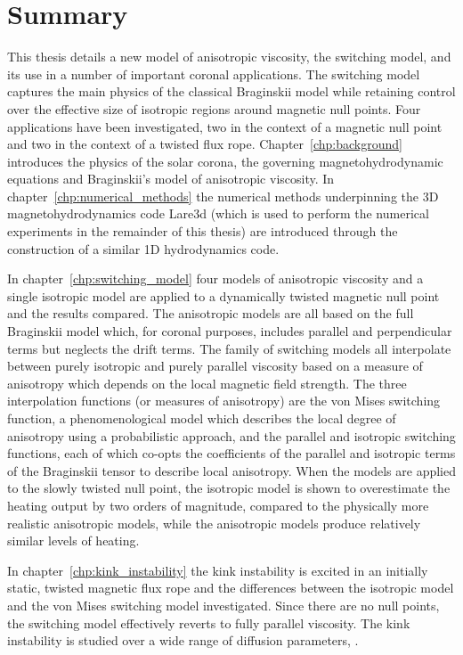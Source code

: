 \chapter{Summary}

This thesis details a new model of anisotropic viscosity, the switching model, and its use in a number of important coronal applications. The switching model captures the main physics of the classical Braginskii model while retaining control over the effective size of isotropic regions around magnetic null points. Four applications have been investigated, two in the context of a magnetic null point and two in the context of a twisted flux rope. Chapter~\ref{chp:background} introduces the physics of the solar corona, the governing magnetohydrodynamic equations and Braginskii's model of anisotropic viscosity. In chapter~\ref{chp:numerical_methods} the numerical methods underpinning the 3D magnetohydrodynamics code Lare3d (which is used to perform the numerical experiments in the remainder of this thesis) are introduced through the construction of a similar 1D hydrodynamics code.

In chapter~\ref{chp:switching_model} four models of anisotropic viscosity and a single isotropic model are applied to a dynamically twisted magnetic null point and the results compared. The anisotropic models are all based on the full Braginskii model which, for coronal purposes, includes parallel and perpendicular terms but neglects the drift terms. The family of switching models all interpolate between purely isotropic and purely parallel viscosity based on a measure of anisotropy which depends on the local magnetic field strength. The three interpolation functions (or measures of anisotropy) are the von Mises switching function, a phenomenological model which describes the local degree of anisotropy using a probabilistic approach, and the parallel and isotropic switching functions, each of which co-opts the coefficients of the parallel and isotropic terms of the Braginskii tensor to describe local anisotropy. When the models are applied to the slowly twisted null point, the isotropic model is shown to overestimate the heating output by two orders of magnitude, compared to the physically more realistic anisotropic models, while the anisotropic models produce relatively similar levels of heating.

In chapter~\ref{chp:kink_instability} the kink instability is excited in an initially static, twisted magnetic flux rope and the differences between the isotropic model and the von Mises switching model investigated. Since there are no null points, the switching model effectively reverts to fully parallel viscosity. The kink instability is studied over a wide range of diffusion parameters, .


